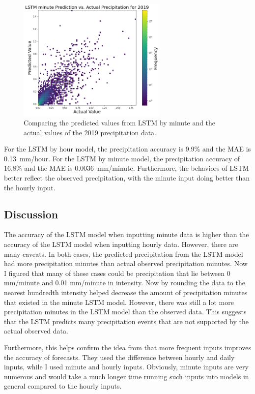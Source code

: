 \documentclass[11pt]{report}
\begin{document}
\begin{figure}[bh!]
	\centering
	\includegraphics[width = 0.65\textwidth]{Figures/LSTM_minute_compare.png}
	\caption[LSTM minute prediction vs. actual data ]{\label{LSTM_minute_compare}
		Comparing the predicted values from LSTM by minute and the actual values of the 2019 precipitation data.
	}
\end{figure}
\clearpage
For the LSTM by hour model, the precipitation accuracy is 9.9\% and the MAE is 0.13~mm/hour. For the LSTM by minute model, the precipitation accuracy of 16.8\% and the MAE is 0.0036~mm/minute. Furthermore, the behaviors of LSTM better reflect the observed precipitation, with the minute input doing better than the hourly input.  

\subsection{Discussion}
The accuracy of the LSTM model when inputting minute data is higher than the accuracy of the LSTM model when inputting hourly data. However, there are many caveats. In both cases, the predicted precipitation from the LSTM model had more precipitation minutes than actual observed precipitation minutes. Now I figured that many of these cases could be precipitation that lie between 0 mm/minute and 0.01 mm/minute in intensity. Now by rounding the data to the nearest hundredth intensity helped decrease the amount of precipitation minutes that existed in the minute LSTM model. However, there was still a lot more precipitation minutes in the LSTM model than the observed data. This suggests that the LSTM predicts many precipitation events that are not supported by the actual observed data. 

Furthermore, this helps confirm the idea from \cite{CNN} that more frequent inputs improves the accuracy of forecasts. They used the difference between hourly and daily inputs, while I used minute and hourly inputs. Obviously, minute inputs are very numerous and would take a much longer time running such inputs into models in general compared to the hourly inputs. 
\end{document}
